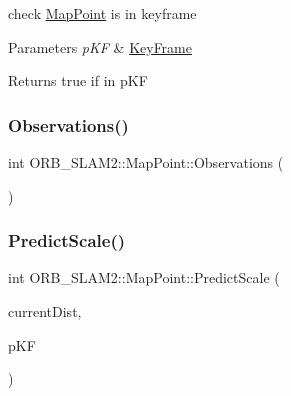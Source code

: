 check \mbox{\hyperlink{class_o_r_b___s_l_a_m2_1_1_map_point}{Map\+Point}} is in keyframe 


\begin{DoxyParams}{Parameters}
{\em p\+KF} & \mbox{\hyperlink{class_o_r_b___s_l_a_m2_1_1_key_frame}{Key\+Frame}} \\
\hline
\end{DoxyParams}
\begin{DoxyReturn}{Returns}
true if in p\+KF 
\end{DoxyReturn}
\mbox{\label{class_o_r_b___s_l_a_m2_1_1_map_point_a7fbc2a95f49eb6facdc5d5fa35de3287}} 
\subsubsection{\texorpdfstring{Observations()}{Observations()}}
{\footnotesize\ttfamily int O\+R\+B\+\_\+\+S\+L\+A\+M2\+::\+Map\+Point\+::\+Observations (\begin{DoxyParamCaption}{ }\end{DoxyParamCaption})}

\mbox{\label{class_o_r_b___s_l_a_m2_1_1_map_point_aa0e884ba7dc5b85ddb5ccb64113a8594}} 
\subsubsection{\texorpdfstring{Predict\+Scale()}{PredictScale()}\hspace{0.1cm}{\footnotesize\ttfamily [1/2]}}
{\footnotesize\ttfamily int O\+R\+B\+\_\+\+S\+L\+A\+M2\+::\+Map\+Point\+::\+Predict\+Scale (\begin{DoxyParamCaption}\item[{const float \&}]{current\+Dist,  }\item[{\mbox{\hyperlink{class_o_r_b___s_l_a_m2_1_1_key_frame}{Key\+Frame}} $\ast$}]{p\+KF }\end{DoxyParamCaption})}

